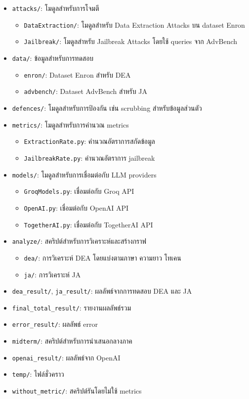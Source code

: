 \begin{itemize}
    \item \texttt{attacks/}: โมดูลสำหรับการโจมตี
    \begin{itemize}
        \item \texttt{DataExtraction/}: โมดูลสำหรับ Data Extraction Attacks บน dataset Enron
        \item \texttt{Jailbreak/}: โมดูลสำหรับ Jailbreak Attacks โดยใช้ queries จาก AdvBench
    \end{itemize}
    \item \texttt{data/}: ข้อมูลสำหรับการทดสอบ
    \begin{itemize}
        \item \texttt{enron/}: Dataset Enron สำหรับ DEA
        \item \texttt{advbench/}: Dataset AdvBench สำหรับ JA
    \end{itemize}
    \item \texttt{defences/}: โมดูลสำหรับการป้องกัน เช่น scrubbing สำหรับข้อมูลส่วนตัว
    \item \texttt{metrics/}: โมดูลสำหรับการคำนวณ metrics
    \begin{itemize}
        \item \texttt{ExtractionRate.py}: คำนวณอัตราการสกัดข้อมูล
        \item \texttt{JailbreakRate.py}: คำนวณอัตราการ jailbreak
    \end{itemize}
    \item \texttt{models/}: โมดูลสำหรับการเชื่อมต่อกับ LLM providers
    \begin{itemize}
        \item \texttt{GroqModels.py}: เชื่อมต่อกับ Groq API
        \item \texttt{OpenAI.py}: เชื่อมต่อกับ OpenAI API
        \item \texttt{TogetherAI.py}: เชื่อมต่อกับ TogetherAI API
    \end{itemize}
    \item \texttt{analyze/}: สคริปต์สำหรับการวิเคราะห์และสร้างกราฟ
    \begin{itemize}
        \item \texttt{dea/}: การวิเคราะห์ DEA โดยแบ่งตามภาษา ความยาว โทเคน
        \item \texttt{ja/}: การวิเคราะห์ JA
    \end{itemize}
    \item \texttt{dea\_result/}, \texttt{ja\_result/}: ผลลัพธ์จากการทดสอบ DEA และ JA
    \item \texttt{final\_total\_result/}: รายงานผลลัพธ์รวม
    \item \texttt{error\_result/}: ผลลัพธ์ error
    \item \texttt{midterm/}: สคริปต์สำหรับการนำเสนอกลางภาค
    \item \texttt{openai\_result/}: ผลลัพธ์จาก OpenAI
    \item \texttt{temp/}: ไฟล์ชั่วคราว
    \item \texttt{without\_metric/}: สคริปต์รันโดยไม่ใช้ metrics
\end{itemize}